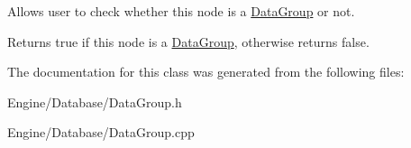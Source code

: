 Allows user to check whether this node is a \hyperlink{classDatabase_1_1DataGroup}{Data\+Group} or not. 

\begin{DoxyReturn}{Returns}
true if this node is a \hyperlink{classDatabase_1_1DataGroup}{Data\+Group}, otherwise returns false. 
\end{DoxyReturn}


The documentation for this class was generated from the following files\+:\begin{DoxyCompactItemize}
\item 
Engine/\+Database/Data\+Group.\+h\item 
Engine/\+Database/Data\+Group.\+cpp\end{DoxyCompactItemize}
